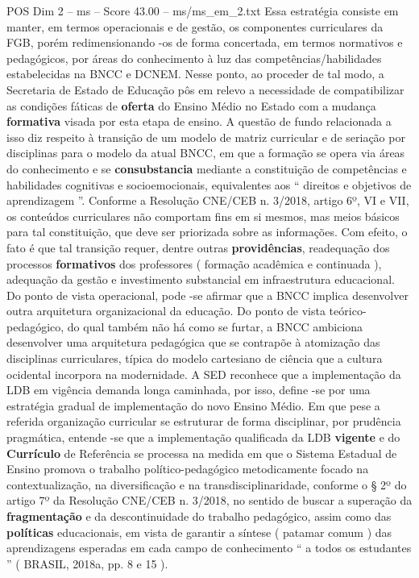 \begin{textsample}{POS Dim 2 – ms – Score 43.00 – ms/ms\_em\_2.txt}
Essa estratégia consiste em manter, em termos operacionais e de gestão, os componentes curriculares da FGB, porém redimensionando -os de forma concertada, em termos normativos e pedagógicos, por áreas do conhecimento à luz das competências/habilidades estabelecidas na BNCC e DCNEM.
Nesse ponto, ao proceder de tal modo, a Secretaria de Estado de Educação pôs em relevo a necessidade de compatibilizar as condições fáticas de \textbf{oferta} do Ensino Médio no Estado com a mudança \textbf{formativa} visada por esta etapa de ensino.
A questão de fundo relacionada a isso diz respeito à transição de um modelo de matriz curricular e de seriação por disciplinas para o modelo da atual BNCC, em que a formação se opera via áreas do conhecimento e se \textbf{consubstancia} mediante a constituição de competências e habilidades cognitivas e socioemocionais, equivalentes aos “ direitos e objetivos de aprendizagem ”.
Conforme a Resolução CNE/CEB n. 3/2018, artigo 6º, VI e VII, os conteúdos curriculares não comportam fins em si mesmos, mas meios básicos para tal constituição, que deve ser priorizada sobre as informações.
Com efeito, o fato é que tal transição requer, dentre outras \textbf{providências}, readequação dos processos \textbf{formativos} dos professores ( formação acadêmica e continuada ), adequação da gestão e investimento substancial em infraestrutura educacional.
Do ponto de vista operacional, pode -se afirmar que a BNCC implica desenvolver outra arquitetura organizacional da educação.
Do ponto de vista teórico-pedagógico, do qual também não há como se furtar, a BNCC ambiciona desenvolver uma arquitetura pedagógica que se contrapõe à atomização das disciplinas curriculares, típica do modelo cartesiano de ciência que a cultura ocidental incorpora na modernidade.
A SED reconhece que a implementação da LDB em vigência demanda longa caminhada, por isso, define -se por uma estratégia gradual de implementação do novo Ensino Médio.
Em que pese a referida organização curricular se estruturar de forma disciplinar, por prudência pragmática, entende -se que a implementação qualificada da LDB \textbf{vigente} e do \textbf{Currículo} de Referência se processa na medida em que o Sistema Estadual de Ensino promova o trabalho político-pedagógico metodicamente focado na contextualização, na diversificação e na transdisciplinaridade, conforme o § 2º do artigo 7º da Resolução CNE/CEB n. 3/2018, no sentido de buscar a superação da \textbf{fragmentação} e da descontinuidade do trabalho pedagógico, assim como das \textbf{políticas} educacionais, em vista de garantir a síntese ( patamar comum ) das aprendizagens esperadas em cada campo de conhecimento “ a todos os estudantes ” ( BRASIL, 2018a, pp. 8 e 15 ).

\end{textsample}
